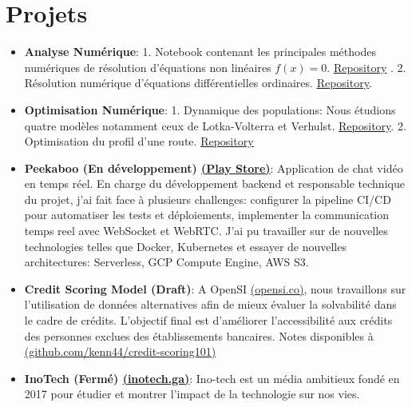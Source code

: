 \documentclass[letterpaper,11pt]{article}
\newcommand{\resumeItem}[2]{
  \item\small{
    \textbf{#1}{: #2 \vspace{-2pt}}
  }
}
\newcommand{\resumeSubItem}[2]{\resumeItem{#1}{#2}\vspace{-4pt}}
\newcommand{\resumeSubHeadingListStart}{\begin{itemize}[leftmargin=*]}
\newcommand{\resumeSubHeadingListEnd}{\end{itemize}}
\begin{document}
\section{Projets}
  \resumeSubHeadingListStart
      \resumeSubItem{Analyse Numérique}
      {1. Notebook contenant les principales méthodes
numériques de résolution d'équations non linéaires $f(x)=0$. 
\href{https://github.com/kenn44/root-finding-algorithms}{\underline{Repository}}
. 2. Résolution numérique d'équations différentielles ordinaires. 
\href{https://github.com/kenn44/numerical-ordinary-differential-equations}{
\underline{Repository}}.}
      \resumeSubItem{Optimisation Numérique}
      {1. Dynamique des populations: Nous étudions quatre modèles notamment ceux 
de Lotka-Volterra et Verhulst. 
\href{https://github.com/kenn44/modeling-in-population-dynamics}{\underline{
Repository}}. 2. Optimisation du profil d’une route.
\href{https://github.com/kenn44/optimizing-the-profile-of-a-road}{\underline{
Repository}}}
    \resumeSubItem{Peekaboo (En développement) 
\href{https://play.google.com/store/apps/details?id=mvp.peekaboo.dev}{
(\underline{Play Store})}}
      {Application de chat vidéo en temps réel. En charge du développement 
backend et responsable technique du projet, j'ai fait face à plusieurs 
challenges: configurer la pipeline CI/CD pour automatiser les tests et 
déploiements, implementer la communication temps reel avec WebSocket et 
WebRTC. J'ai pu travailler sur de nouvelles technologies telles que Docker, 
Kubernetes et essayer de nouvelles architectures: Serverless, GCP Compute 
Engine, AWS S3.}
    \resumeSubItem{Credit Scoring Model (Draft)}
      {A OpenSI \href{http://opensi.co/}{(opensi.co)}, nous travaillons sur 
l’utilisation de données alternatives afin de mieux évaluer la solvabilité dans 
le cadre de crédits. L'objectif final est d'améliorer l'accessibilité aux crédits 
des personnes exclues des établissements bancaires. Notes disponibles à 
\href{https://github.com/kenn44/credit-scoring101}{ 
(github.com/kenn44/credit-scoring101)} }
    \resumeSubItem{InoTech (Fermé) \href{https://inotech.ga/}{(inotech.ga)}}
      {Ino-tech est un média ambitieux fondé en 2017 pour étudier et montrer 
l'impact de la technologie sur nos vies.}
  \resumeSubHeadingListEnd

%


\end{document}
